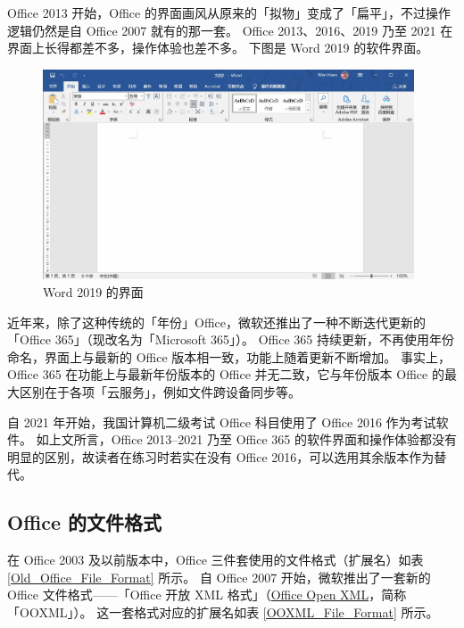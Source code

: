 Office 2013 开始，Office 的界面画风从原来的「拟物」变成了「扁平」，不过操作逻辑仍然是自 Office 2007 就有的那一套。
Office 2013、2016、2019 乃至 2021 在界面上长得都差不多，操作体验也差不多。
下图是 Word 2019 的软件界面。

\begin{figure}[htb!]
  \centering
  \includegraphics[width=11cm]{assets/Word_2019.jpg}
  \caption{Word 2019 的界面}
  \label{Word_2019}
\end{figure}

近年来，除了这种传统的「年份」Office，微软还推出了一种不断迭代更新的「Office 365」（现改名为「Microsoft 365」）。
Office 365 持续更新，不再使用年份命名，界面上与最新的 Office 版本相一致，功能上随着更新不断增加。
事实上，Office 365 在功能上与最新年份版本的 Office 并无二致，它与年份版本 Office 的最大区别在于各项「云服务」，例如文件跨设备同步等。

\begin{note}
  自 2021 年开始，我国计算机二级考试 Office 科目使用了 Office 2016 作为考试软件。
  如上文所言，Office 2013--2021 乃至 Office 365 的软件界面和操作体验都没有明显的区别，故读者在练习时若实在没有 Office 2016，可以选用其余版本作为替代。
\end{note}

\subsection{Office 的文件格式}

在 Office 2003 及以前版本中，Office 三件套使用的文件格式（扩展名）如表 \ref{Old_Office_File_Format} 所示。
自 Office 2007 开始，微软推出了一套新的 Office 文件格式——「Office 开放 XML 格式」（\href{http://officeopenxml.com/}{Office Open XML}，简称「OOXML」）。
这一套格式对应的扩展名如表 \ref{OOXML_File_Format} 所示。

